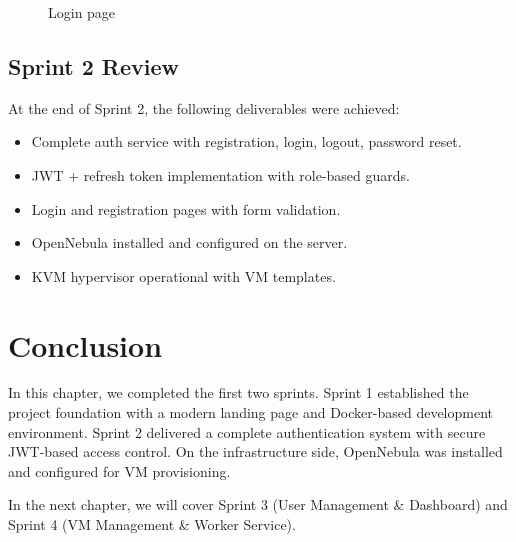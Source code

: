 \begin{figure}[H]
\centering
{}
\caption{Login page}
\label{fig:login-page}
\end{figure}

\subsection{Sprint 2 Review}

At the end of Sprint 2, the following deliverables were achieved:
\begin{itemize}
  \item Complete auth service with registration, login, logout, password reset.
  \item JWT + refresh token implementation with role-based guards.
  \item Login and registration pages with form validation.
  \item OpenNebula installed and configured on the server.
  \item KVM hypervisor operational with VM templates.
\end{itemize}

\section{Conclusion}

In this chapter, we completed the first two sprints. Sprint 1 established the project foundation with a modern landing page and Docker-based development environment. Sprint 2 delivered a complete authentication system with secure JWT-based access control. On the infrastructure side, OpenNebula was installed and configured for VM provisioning.

In the next chapter, we will cover Sprint 3 (User Management \& Dashboard) and Sprint 4 (VM Management \& Worker Service).

